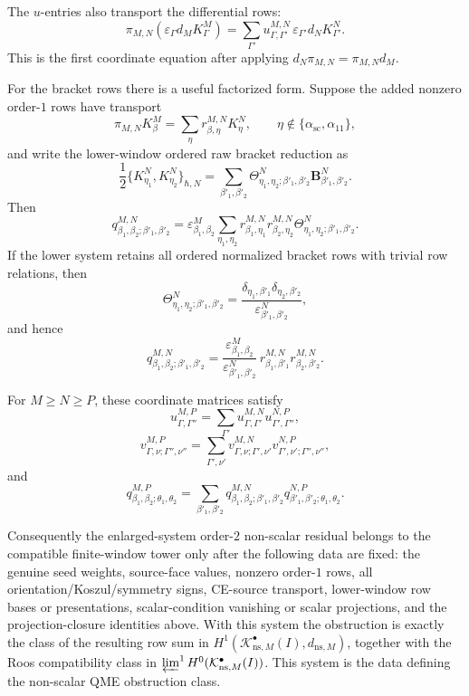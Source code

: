 \begin{prop}
  The \(u\)-entries also transport the differential rows:
  \[
    \pi_{M,N}(\varepsilon_\Gamma d_MK^M_\Gamma)
      =
    \sum_{\Gamma'}
      u^{M,N}_{\Gamma,\Gamma'}\,
      \varepsilon_{\Gamma'}d_NK^N_{\Gamma'}.
  \]
  This is the first coordinate equation after applying
  \(d_N\pi_{M,N}=\pi_{M,N}d_M\).

  For the bracket rows there is a useful factorized form.  Suppose the
  added nonzero order-\(1\) rows have transport
  \[
    \pi_{M,N}K^M_\beta
      =
    \sum_{\eta}r^{M,N}_{\beta,\eta}K^N_\eta,
    \qquad
    \eta\notin\{\alpha_{\mathrm{sc}},\alpha_{11}\},
  \]
  and write the lower-window ordered raw bracket reduction as
  \[
    \frac12\{K^N_{\eta_1},K^N_{\eta_2}\}_{\hbar,N}
      =
    \sum_{\beta'_1,\beta'_2}
      \Theta^N_{\eta_1,\eta_2;\beta'_1,\beta'_2}
      \mathbf B^N_{\beta'_1,\beta'_2}.
  \]
  Then
  \[
    q^{M,N}_{\beta_1,\beta_2;\beta'_1,\beta'_2}
      =
    \varepsilon^M_{\beta_1,\beta_2}
    \sum_{\eta_1,\eta_2}
      r^{M,N}_{\beta_1,\eta_1}
      r^{M,N}_{\beta_2,\eta_2}
      \Theta^N_{\eta_1,\eta_2;\beta'_1,\beta'_2}.
  \]
  If the lower system retains all ordered normalized bracket rows with
  trivial row relations, then
  \[
    \Theta^N_{\eta_1,\eta_2;\beta'_1,\beta'_2}
      =
    \frac{
      \delta_{\eta_1,\beta'_1}\delta_{\eta_2,\beta'_2}
    }{\varepsilon^N_{\beta'_1,\beta'_2}},
  \]
  and hence
  \[
    q^{M,N}_{\beta_1,\beta_2;\beta'_1,\beta'_2}
      =
    \frac{\varepsilon^M_{\beta_1,\beta_2}}
         {\varepsilon^N_{\beta'_1,\beta'_2}}\,
    r^{M,N}_{\beta_1,\beta'_1}
    r^{M,N}_{\beta_2,\beta'_2}.
  \]

  For \(M\geq N\geq P\), these coordinate matrices satisfy
  \[
    u^{M,P}_{\Gamma,\Gamma''}
      =
    \sum_{\Gamma'}
      u^{M,N}_{\Gamma,\Gamma'}u^{N,P}_{\Gamma',\Gamma''},
  \]
  \[
    v^{M,P}_{\Gamma,\nu;\Gamma'',\nu''}
      =
    \sum_{\Gamma',\nu'}
      v^{M,N}_{\Gamma,\nu;\Gamma',\nu'}
      v^{N,P}_{\Gamma',\nu';\Gamma'',\nu''},
  \]
  and
  \[
    q^{M,P}_{\beta_1,\beta_2;\theta_1,\theta_2}
      =
    \sum_{\beta'_1,\beta'_2}
      q^{M,N}_{\beta_1,\beta_2;\beta'_1,\beta'_2}
      q^{N,P}_{\beta'_1,\beta'_2;\theta_1,\theta_2}.
  \]

  Consequently the enlarged-system order-\(2\) non-scalar residual belongs
  to the compatible finite-window tower only after
  the following data are fixed: the genuine seed weights, source-face
  values, nonzero order-\(1\) rows, all orientation/Koszul/symmetry signs,
  CE-source transport, lower-window row bases or presentations, scalar-condition
  vanishing or scalar projections, and the projection-closure identities
  above.  With this system the obstruction is exactly the class of the
  resulting row sum in
  \(H^1(\mathcal K^\bullet_{\mathrm{ns},M}(I),d_{\mathrm{ns},M})\),
  together with the Roos compatibility class in
  \(\varprojlim^1 H^0(\mathcal K^\bullet_{\mathrm{ns},M}(I))\).  This
  system is the data defining the non-scalar QME obstruction class.
\end{prop}

